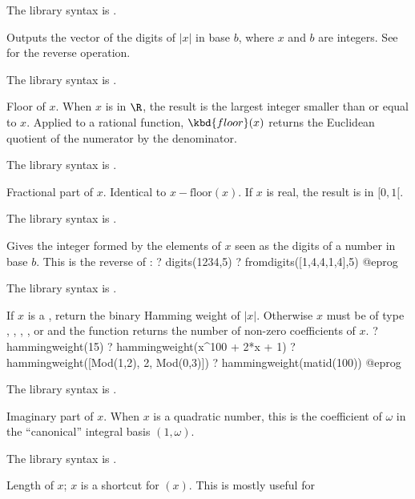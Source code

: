 The library syntax is .

\label{se:digits}
Outputs the vector of the digits of $|x|$ in base $b$, where $x$ and $b$ are integers.
See  for the reverse operation.

The library syntax is .

\label{se:floor}
Floor of $x$. When $x$ is in $\R$, the result is the
largest integer smaller than or equal to $x$. Applied to a rational function,
$\kbd{floor}(x)$ returns the Euclidean quotient of the numerator by the
denominator.

The library syntax is .

\label{se:frac}
Fractional part of $x$. Identical to
$x-\text{floor}(x)$. If $x$ is real, the result is in $[0,1[$.

The library syntax is .

\label{se:fromdigits}
Gives the integer formed by the elements of $x$ seen as the digits of a
number in base $b$.  This is the reverse of :
\bprog
? digits(1234,5)
? fromdigits([1,4,4,1,4],5)
@eprog

The library syntax is .

\label{se:hammingweight}
If $x$ is a , return the binary Hamming weight of $|x|$. Otherwise
$x$ must be of type , , , , or
 and the function returns the number of non-zero coefficients of
$x$.
\bprog
? hammingweight(15)
? hammingweight(x^100 + 2*x + 1)
? hammingweight([Mod(1,2), 2, Mod(0,3)])
? hammingweight(matid(100))
@eprog

The library syntax is .

\label{se:imag}
Imaginary part of $x$. When $x$ is a quadratic number, this is the
coefficient of $\omega$ in the ``canonical'' integral basis $(1,\omega)$.

The library syntax is .

\label{se:length}
Length of $x$; \kbd{\#}$x$ is a shortcut for $(x)$.
This is mostly useful for

